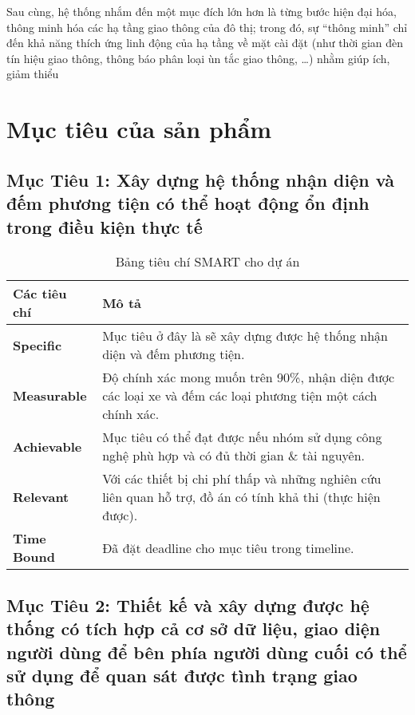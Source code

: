 \quad Sau cùng, hệ thống nhắm đến một mục đích lớn hơn là từng bước hiện đại hóa, thông minh hóa các hạ tầng giao thông của đô thị; trong đó, sự “thông minh” chỉ đến khả năng thích ứng linh động của hạ tầng về mặt cài đặt (như thời gian đèn tín hiệu giao thông, thông báo phân loại ùn tắc giao thông, …) nhằm giúp ích, giảm thiểu 

\section{Mục tiêu của sản phẩm}
\subsection*{Mục Tiêu 1: Xây dựng hệ thống nhận diện và đếm phương tiện có thể hoạt động ổn định trong điều kiện thực tế}

\begin{table}[h!]
    \centering
    \begin{tabular}{|p{4cm}|p{10cm}|}
    \hline
    \textbf{Các tiêu chí} & \textbf{Mô tả} \\
    \hline
    \textbf{Specific} & Mục tiêu ở đây là sẽ xây dựng được hệ thống nhận diện và đếm phương tiện. \\
    \hline
    \textbf{Measurable} & Độ chính xác mong muốn trên 90\%, nhận diện được các loại xe và đếm các loại phương tiện một cách chính xác. \\
    \hline
    \textbf{Achievable} & Mục tiêu có thể đạt được nếu nhóm sử dụng công nghệ phù hợp và có đủ thời gian \& tài nguyên. \\
    \hline
    \textbf{Relevant} & Với các thiết bị chi phí thấp và những nghiên cứu liên quan hỗ trợ, đồ án có tính khả thi (thực hiện được). \\
    \hline
    \textbf{Time Bound} & Đã đặt deadline cho mục tiêu trong timeline. \\
    \hline
    \end{tabular}
    \caption{Bảng tiêu chí SMART cho dự án}
\end{table}
\pagebreak
\subsection*{Mục Tiêu 2: Thiết kế và xây dựng được hệ thống có tích hợp cả cơ sở dữ liệu, giao diện người dùng để bên phía người dùng cuối có thể sử dụng để quan sát được tình trạng giao thông}

